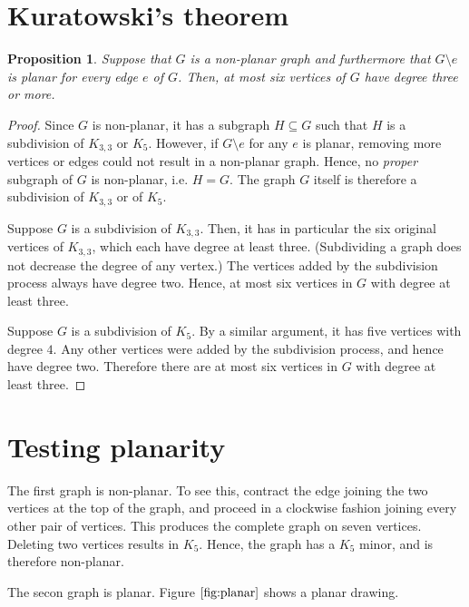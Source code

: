 \documentclass[12pt,letterpaper]{article}
\newcommand{\question}{\section}
\newtheorem{prop}{Proposition}
\begin{document}
\question{Kuratowski's theorem}

\begin{prop}
    Suppose that $G$ is a non-planar graph and furthermore that $G \setminus e$
    is planar for every edge $e$ of $G$. Then, at most six vertices of $G$ have
    degree three or more.
\end{prop}

\begin{proof}
    Since $G$ is non-planar, it has a subgraph $H \subseteq G$ such that $H$ is
    a subdivision of $K_{3,3}$ or $K_5$. However, if $G \setminus e$ for any
    $e$ is planar, removing more vertices or edges could not result in a
    non-planar graph. Hence, no \emph{proper} subgraph of $G$ is non-planar,
    i.e. $H = G$. The graph $G$ itself is therefore a subdivision of $K_{3, 3}$
    or of $K_5$.

    Suppose $G$ is a subdivision of $K_{3, 3}$. Then, it has in particular the
    six original vertices of $K_{3, 3}$, which each have degree at least three.
    (Subdividing a graph does not decrease the degree of any vertex.) The
    vertices added by the subdivision process always have degree two. Hence, at
    most six vertices in $G$ with degree at least three.

    Suppose $G$ is a subdivision of $K_{5}$. By a similar argument, it has five
    vertices with degree $4$. Any other vertices were added by the subdivision
    process, and hence have degree two. Therefore there are at most six
    vertices in $G$ with degree at least three.
\end{proof}

\question{Testing planarity}

The first graph is non-planar. To see this, contract the edge joining the two
vertices at the top of the graph, and proceed in a clockwise fashion joining
every other pair of vertices. This produces the complete graph on seven
vertices. Deleting two vertices results in $K_5$. Hence, the graph has a $K_5$
minor, and is therefore non-planar.

The secon graph is planar. Figure $\ref{fig:planar}$ shows a planar drawing.
\end{document}
